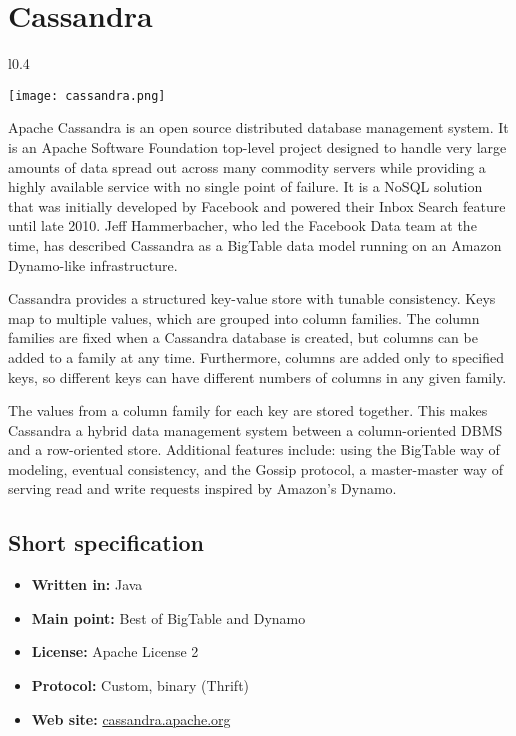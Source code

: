 \chapter{Cassandra}

\begin{wrapfigure}{l}{0.4\textwidth}
  \vspace{-70pt}
  \begin{center}
    \texttt{[image: cassandra.png]}
  \end{center}
  \vspace{-10pt}
\end{wrapfigure}
Apache Cassandra is an open source distributed database management system. It is an Apache Software Foundation top-level project designed to handle very large amounts of data spread out across many commodity servers while providing a highly available service with no single point of failure. It is a NoSQL solution that was initially developed by Facebook and powered their Inbox Search feature until late 2010. Jeff Hammerbacher, who led the Facebook Data team at the time, has described Cassandra as a BigTable data model running on an Amazon Dynamo-like infrastructure.

Cassandra provides a structured key-value store with tunable consistency. Keys map to multiple values, which are grouped into column families. The column families are fixed when a Cassandra database is created, but columns can be added to a family at any time. Furthermore, columns are added only to specified keys, so different keys can have different numbers of columns in any given family.

The values from a column family for each key are stored together. This makes Cassandra a hybrid data management system between a column-oriented DBMS and a row-oriented store. Additional features include: using the BigTable way of modeling, eventual consistency, and the Gossip protocol, a master-master way of serving read and write requests inspired by Amazon's Dynamo.

\section{Short specification}

\begin{itemize}
  \item \textbf{Written in:} Java
  \item \textbf{Main point:} Best of BigTable and Dynamo
  \item \textbf{License:} Apache License 2
  \item \textbf{Protocol:} Custom, binary (Thrift)
  \item \textbf{Web site:} \href{http://cassandra.apache.org/}{cassandra.apache.org}
\end{itemize}